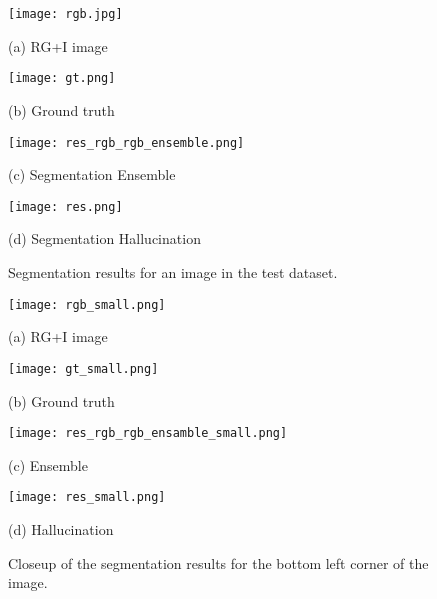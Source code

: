 \documentclass[journal]{IEEEtran}
\begin{document}
\label{sec:vaihingen}
\begin{figure}[htbp]
\begin{minipage}[b]{0.48\linewidth}
  \centering
 \texttt{[image: rgb.jpg]}
  \centerline{(a) RG+I image}\medskip
\end{minipage}
\hfill
\begin{minipage}[b]{0.48\linewidth}
  \centering
 \texttt{[image: gt.png]}
  \centerline{(b) Ground truth}\medskip
\end{minipage}
\begin{minipage}[b]{.48\linewidth}
  \centering
  \texttt{[image: res\_rgb\_rgb\_ensemble.png]}
  \centerline{(c) Segmentation Ensemble}\medskip
\end{minipage}
\hfill
\begin{minipage}[b]{0.48\linewidth}
  \centering
  \texttt{[image: res.png]}
  \centerline{(d) Segmentation Hallucination}\medskip
\end{minipage}
\caption{Segmentation results for an image in the test dataset.}
\label{fig:res}
\end{figure}

\begin{figure}[htbp]
\begin{minipage}[b]{0.48\linewidth}
  \centering
 \texttt{[image: rgb\_small.png]}
  \centerline{(a) RG+I image}\medskip
\end{minipage}
\hfill
\begin{minipage}[b]{0.48\linewidth}
  \centering
 \texttt{[image: gt\_small.png]}
  \centerline{(b) Ground truth}\medskip
\end{minipage}
\begin{minipage}[b]{0.48\linewidth}
  \centering
 \texttt{[image: res\_rgb\_rgb\_ensamble\_small.png]}
  \centerline{(c) Ensemble}\medskip
\end{minipage}
\hfill
\begin{minipage}[b]{0.48\linewidth}
  \centering
 \texttt{[image: res\_small.png]}
  \centerline{(d) Hallucination}\medskip
\end{minipage}
\caption{Closeup of the segmentation results for the bottom left corner of the image.}
\label{fig:res_close}
\end{figure}
\end{document}
